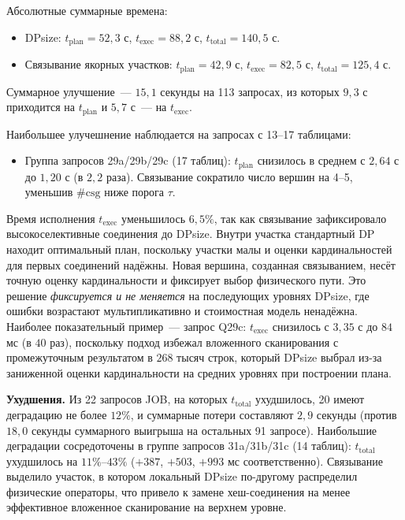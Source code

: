 Абсолютные суммарные времена:
\begin{itemize}
    \item DPsize: $t_{\mathrm{plan}} = 52{,}3$ с, $t_{\mathrm{exec}} = 88{,}2$ с,
    $t_{\mathrm{total}} = 140{,}5$ с.
    \item Связывание якорных участков: $t_{\mathrm{plan}} = 42{,}9$ с,
    $t_{\mathrm{exec}} = 82{,}5$ с, $t_{\mathrm{total}} = 125{,}4$ с.
\end{itemize}
\par

Суммарное улучшение~--- $15{,}1$ секунды на 113 запросах,
из которых $9{,}3$ с приходится на $t_{\mathrm{plan}}$
и $5{,}7$ с~--- на $t_{\mathrm{exec}}$.
\par

Наибольшее улучешнение наблюдается на запросах с 13--17 таблицами:
\begin{itemize}
    \item Группа запросов 29a/29b/29c (17 таблиц):
    $t_{\mathrm{plan}}$ снизилось в среднем с $2{,}64$ с
    до $1{,}20$ с (в $2{,}2$ раза). Связывание сократило число вершин
    на 4--5, уменьшив $\#\mathrm{csg}$ ниже порога $\tau$.
\end{itemize}
\par

Время исполнения $t_{\mathrm{exec}}$ уменьшилось $6{,}5\%$, так как связывание 
зафиксировало высокоселективные соединения до DPsize.
Внутри участка стандартный DP находит оптимальный план,
поскольку участки малы и оценки кардинальностей для первых соединений надёжны.
Новая вершина, созданная связыванием, несёт точную оценку кардинальности
и фиксирует выбор физического пути.
Это решение \emph{фиксируется и не меняется} на последующих уровнях DPsize,
где ошибки возрастают мультипликативно и стоимостная модель ненадёжна.
Наиболее показательный пример~--- запрос Q29c: $t_{\mathrm{exec}}$ снизилось
с $3{,}35$ с до $84$ мс (в $40$ раз), поскольку подход избежал вложенного 
сканирования с промежуточным результатом в $268$ тысяч строк,
который DPsize выбрал из-за заниженной оценки кардинальности
на средних уровнях при построении плана.
\par

\textbf{Ухудшения.}
Из 22 запросов JOB, на которых $t_{\mathrm{total}}$ ухудшилось,
20 имеют деградацию не более $12\%$, и суммарные потери составляют
$2{,}9$ секунды (против $18{,}0$ секунды суммарного выигрыша
на остальных 91 запросе).
Наибольшие деградации сосредоточены в группе запросов 31a/31b/31c
(14 таблиц): $t_{\mathrm{total}}$ ухудшилось на $11\%$--$43\%$
($+387$, $+503$, $+993$ мс соответственно).
Связывание выделило участок, в котором локальный DPsize
по-другому распределил физические операторы,
что привело к замене хеш-соединения на менее эффективное вложенное сканирование на верхнем
уровне.
\par

